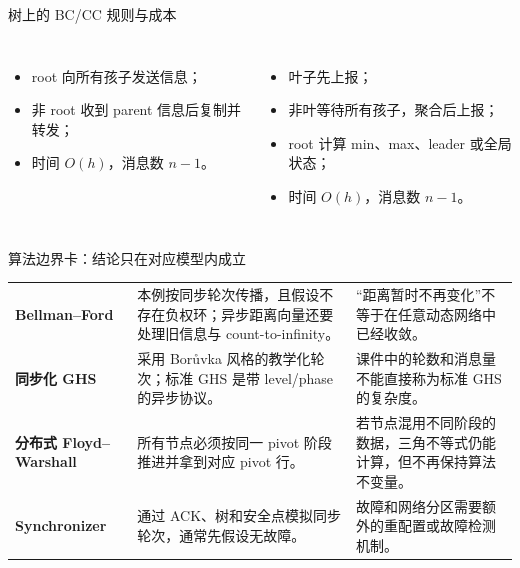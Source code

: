 \documentclass[UTF8,fontset=none,aspectratio=169,10pt]{beamer}
\begin{document}
\begin{frame}{树上的 BC/CC 规则与成本}
\begin{columns}[T,onlytextwidth]
\begin{itemize}
  \item root 向所有孩子发送信息；
  \item 非 root 收到 parent 信息后复制并转发；
  \item 时间 $O(h)$，消息数 $n-1$。
\end{itemize}
\begin{itemize}
  \item 叶子先上报；
  \item 非叶等待所有孩子，聚合后上报；
  \item root 计算 min、max、leader 或全局状态；
  \item 时间 $O(h)$，消息数 $n-1$。
\end{itemize}
\end{columns}
\vfill
{}
\end{frame}

\latercontent
\begin{frame}{算法边界卡：结论只在对应模型内成立}
\small
\begin{tabularx}{\linewidth}{>{\bfseries}p{3.0cm}XX}
\toprule
Bellman--Ford & 本例按同步轮次传播，且假设不存在负权环；异步距离向量还要处理旧信息与 count-to-infinity。 & “距离暂时不再变化”不等于在任意动态网络中已经收敛。 \\
同步化 GHS & 采用 Borůvka 风格的教学化轮次；标准 GHS 是带 level/phase 的异步协议。 & 课件中的轮数和消息量不能直接称为标准 GHS 的复杂度。 \\
分布式 Floyd--Warshall & 所有节点必须按同一 pivot 阶段推进并拿到对应 pivot 行。 & 若节点混用不同阶段的数据，三角不等式仍能计算，但不再保持算法不变量。 \\
Synchronizer & 通过 ACK、树和安全点模拟同步轮次，通常先假设无故障。 & 故障和网络分区需要额外的重配置或故障检测机制。 \\
\bottomrule
\end{tabularx}
\vfill
{}
\end{frame}
\end{document}
